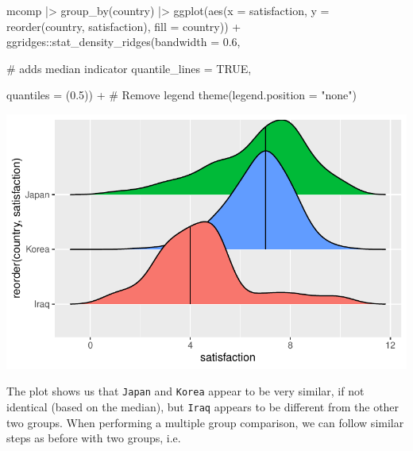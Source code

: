 \documentclass[
  letterpaper,
]{krantz}
\makeatletter
\newenvironment{Shaded}{\begin{snugshade}}{\end{snugshade}}
\newcommand{\AttributeTok}[1]{\textcolor[rgb]{0.40,0.45,0.13}{#1}}
\newcommand{\CommentTok}[1]{\textcolor[rgb]{0.37,0.37,0.37}{#1}}
\newcommand{\ConstantTok}[1]{\textcolor[rgb]{0.56,0.35,0.01}{#1}}
\newcommand{\FloatTok}[1]{\textcolor[rgb]{0.68,0.00,0.00}{#1}}
\newcommand{\FunctionTok}[1]{\textcolor[rgb]{0.28,0.35,0.67}{#1}}
\newcommand{\NormalTok}[1]{\textcolor[rgb]{0.00,0.23,0.31}{#1}}
\newcommand{\SpecialCharTok}[1]{\textcolor[rgb]{0.37,0.37,0.37}{#1}}
\newcommand{\StringTok}[1]{\textcolor[rgb]{0.13,0.47,0.30}{#1}}
\newenvironment{kframe}{%
\medskip{}
\setlength{\fboxsep}{.8em}
 \def\at@end@of@kframe{}%
 \ifinner\ifhmode%
  \def\at@end@of@kframe{\end{minipage}}%
  \begin{minipage}{\columnwidth}%
 \fi\fi%
 \def\FrameCommand##1{\hskip\@totalleftmargin \hskip-\fboxsep
 \colorbox{shadecolor}{##1}\hskip-\fboxsep
     \hskip-\linewidth \hskip-\@totalleftmargin \hskip\columnwidth}%
 \MakeFramed {\advance\hsize-\width
   \@totalleftmargin\z@ \linewidth\hsize
   \@setminipage}}%
 {\par\unskip\endMakeFramed%
 \at@end@of@kframe}
\renewenvironment{Shaded}{\begin{kframe}}{\end{kframe}}
\makeatother
\begin{document}
\begin{Shaded}
\begin{Highlighting}[]
\NormalTok{mcomp }\SpecialCharTok{|\textgreater{}}
  \FunctionTok{group\_by}\NormalTok{(country) }\SpecialCharTok{|\textgreater{}}
  \FunctionTok{ggplot}\NormalTok{(}\FunctionTok{aes}\NormalTok{(}\AttributeTok{x =}\NormalTok{ satisfaction,}
             \AttributeTok{y =} \FunctionTok{reorder}\NormalTok{(country, satisfaction),}
             \AttributeTok{fill =}\NormalTok{ country)) }\SpecialCharTok{+}
\NormalTok{  ggridges}\SpecialCharTok{::}\FunctionTok{stat\_density\_ridges}\NormalTok{(}\AttributeTok{bandwidth =} \FloatTok{0.6}\NormalTok{,}
                                
                                \CommentTok{\# adds median indicator}
                                \AttributeTok{quantile\_lines =} \ConstantTok{TRUE}\NormalTok{,}
                                
                                \AttributeTok{quantiles =}\NormalTok{ (}\FloatTok{0.5}\NormalTok{)) }\SpecialCharTok{+}
  \CommentTok{\# Remove legend}
  \FunctionTok{theme}\NormalTok{(}\AttributeTok{legend.position =} \StringTok{"none"}\NormalTok{)}
\end{Highlighting}
\end{Shaded}

\includegraphics{11_group_comparison_files/figure-pdf/multiple-unpaired-groups-plot-1.pdf}

The plot shows us that \texttt{Japan} and \texttt{Korea} appear to be
very similar, if not identical (based on the median), but \texttt{Iraq}
appears to be different from the other two groups. When performing a
multiple group comparison, we can follow similar steps as before with
two groups, i.e.
\end{document}
